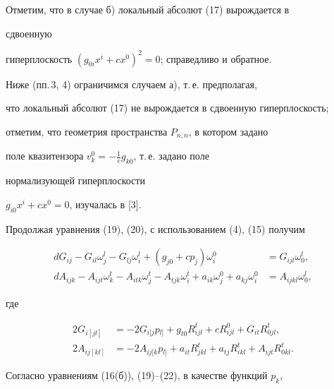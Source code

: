 \noindent{}Отметим, что в случае б) локальный абсолют (17) вырождается в 


сдвоенную 


гиперплоскость $(g_{0i}x^i+c x^0)^2=0$; справедливо и обратное. 


 


Ниже (пп.\,3, 4) ограничимся случаем а), т.\,е. предполагая, 


что локальный абсолют (17) не вырождается в сдвоенную гиперплоскость; 


отметим, что геометрия пространства $P_{n,n}$, в котором задано 


поле квазитензора $v^0_k=-\frac{1}{c}g_{k0}$, т.\,е. задано поле 


нормализующей гиперплоскости 


$g_{i0}x^i+c x^0=0$, изучалась в [3]. 


 


Продолжая уравнения (19), (20), с использованием (4), (15) получим 


\begin{align} 


d G_{ij}-G_{il}\omega^l_j-G_{lj}\omega^l_i+ 


(g_{j0}+c p_j)\omega^0_i&= G_{ijl}\omega^l_0,\\ 


d A_{ijk}-A_{ijt}\omega^t_k-A_{itk}\omega^t_j- 


A_{tjk}\omega^t_i+a_{ik}\omega^0_j+ 


a_{kj}\omega^0_i&= A_{ijkl}\omega^l_0, 


\end{align} 


где 


\begin{align} 


2G_{i[jl]}&=-2G{}_{i[j}p{}_{l]}+g_{t0}R^t_{ijl} 


+c R^0_{ijl}+G_{it}R^t_{0jl},\\ 


2A_{ij[kl]}&=-2A{}_{ij[k}p{}_{l]}+a_{it}R^t_{jkl}+ 


a_{tj}R^t_{ikl}+A_{ijt}R^t_{0kl}. 


\end{align} 


 


Согласно уравнениям (16(б)), (19)--(22), в качестве функций $p_k$, 


